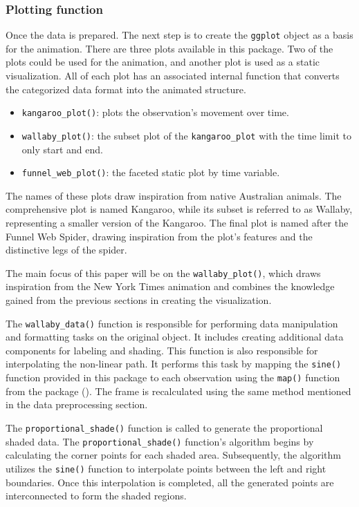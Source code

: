 \subsubsection{Plotting function}\label{plotting-function}

Once the data is prepared. The next step is to create the \texttt{ggplot} object as a basis for the animation. There are three plots available in this package. Two of the plots could be used for the animation, and another plot is used as a static visualization. All of each plot has an associated internal function that converts the categorized data format into the animated structure.

\begin{itemize}
\tightlist
\item
  \texttt{kangaroo\_plot()}: plots the observation's movement over time.
\item
  \texttt{wallaby\_plot()}: the subset plot of the \texttt{kangaroo\_plot} with the time limit to only start and end.
\item
  \texttt{funnel\_web\_plot()}: the faceted static plot by time variable.
\end{itemize}

The names of these plots draw inspiration from native Australian animals. The comprehensive plot is named Kangaroo, while its subset is referred to as Wallaby, representing a smaller version of the Kangaroo. The final plot is named after the Funnel Web Spider, drawing inspiration from the plot's features and the distinctive legs of the spider.

The main focus of this paper will be on the \texttt{wallaby\_plot()}, which draws inspiration from the New York Times animation and combines the knowledge gained from the previous sections in creating the visualization.

The \texttt{wallaby\_data()} function is responsible for performing data manipulation and formatting tasks on the original object. It includes creating additional data components for labeling and shading. This function is also responsible for interpolating the non-linear path. It performs this task by mapping the \texttt{sine()} function provided in this package to each observation using the \texttt{map()} function from the  package (\citet{purrr}). The frame is recalculated using the same method mentioned in the data preprocessing section.

The \texttt{proportional\_shade()} function is called to generate the proportional shaded data. The \texttt{proportional\_shade()} function's algorithm begins by calculating the corner points for each shaded area. Subsequently, the algorithm utilizes the \texttt{sine()} function to interpolate points between the left and right boundaries. Once this interpolation is completed, all the generated points are interconnected to form the shaded regions.

